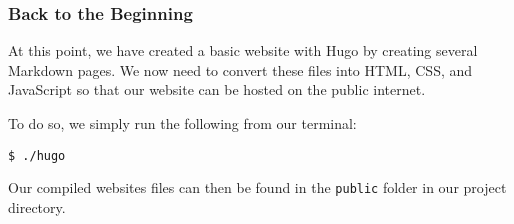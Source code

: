 \begin{frame}[fragile]
    \frametitle{Back to the Beginning}

    At this point, we have created a basic website with Hugo by creating several Markdown pages. We now need to convert
    these files into HTML, CSS, and JavaScript so that our website can be hosted on the public internet.

    \bigskip

    To do so, we simply run the following from our terminal:

    \smallskip

    \begin{lstlisting}[style=saneCode,gobble=8]
        $ ./hugo
    \end{lstlisting}

    \bigskip
    Our compiled websites files can then be found in the \texttt{public} folder in our project directory.
\end{frame}